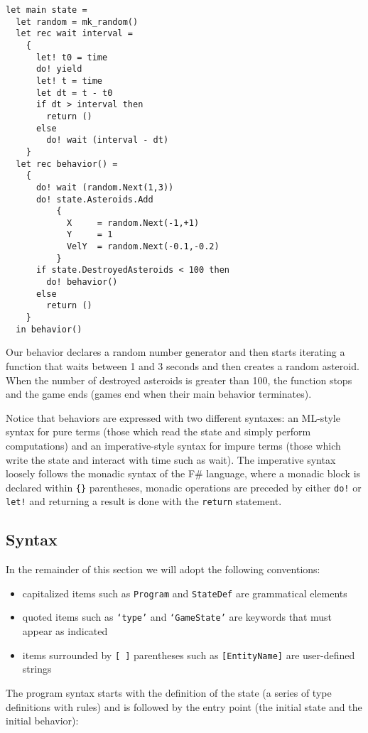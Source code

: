 \begin{lstlisting}
let main state =
  let random = mk_random()
  let rec wait interval =
    {
      let! t0 = time
      do! yield
      let! t = time
      let dt = t - t0
      if dt > interval then
        return ()
      else
        do! wait (interval - dt)
    }  
  let rec behavior() =
    {
      do! wait (random.Next(1,3))
      do! state.Asteroids.Add
      	  {
      	    X     = random.Next(-1,+1)
      	    Y     = 1
      	    VelY  = random.Next(-0.1,-0.2)
      	  }
      if state.DestroyedAsteroids < 100 then
        do! behavior()
      else
        return ()
    }
  in behavior()
\end{lstlisting}
  
Our behavior declares a random number generator and then starts iterating a function that waits between 1 and 3 seconds and then creates a random asteroid. When the number of destroyed asteroids is greater than 100, the function stops and the game ends (games end when their main behavior terminates).

Notice that behaviors are expressed with two different syntaxes: an ML-style syntax for pure terms (those which read the state and simply perform computations) and an imperative-style syntax for impure terms (those which write the state and interact with time such as wait). The imperative syntax loosely follows the monadic syntax of the F\# language, where a monadic block is declared within \texttt{\{\}} parentheses, monadic operations are preceded by either \texttt{do!} or \texttt{let!} and returning a result is done with the \texttt{return} statement.

\subsection{Syntax}
In the remainder of this section we will adopt the following conventions:
\begin{itemize}
\item capitalized items such as \texttt{Program} and \texttt{StateDef} are grammatical elements
\item quoted items such as \texttt{`type'} and \texttt{`GameState'} are keywords that must appear as indicated
\item items surrounded by \texttt{[ ]} parentheses such as \texttt{[EntityName]} are user-defined strings
\end{itemize}

The program syntax starts with the definition of the state (a series of type definitions with rules) and is followed by the entry point (the initial state and the initial behavior):

